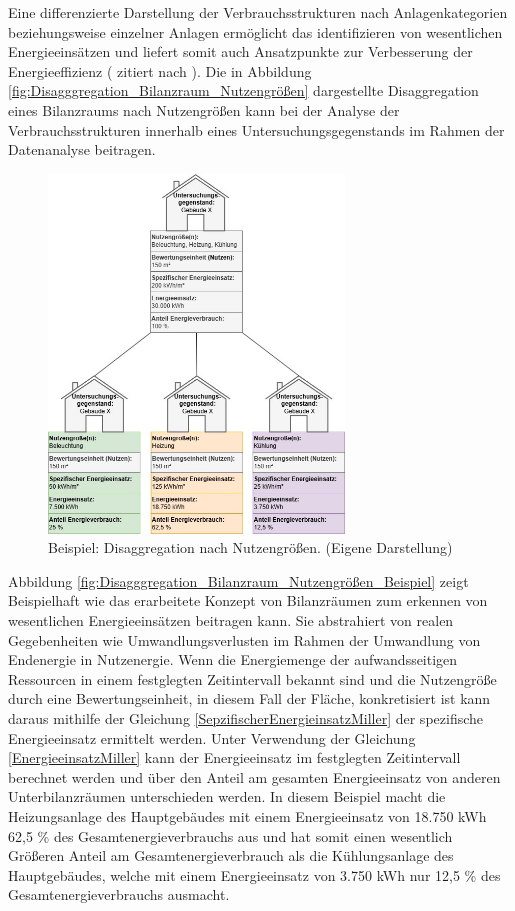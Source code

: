 Eine differenzierte Darstellung der Verbrauchsstrukturen nach Anlagenkategorien beziehungsweise einzelner Anlagen ermöglicht das identifizieren von 
wesentlichen Energieeinsätzen und liefert somit auch Ansatzpunkte zur Verbesserung der Energieeffizienz (\cite{Fink.1997} zitiert nach \cite[S. 8]{Hohnhold.2013}).
Die in Abbildung \eqref{fig:Disagggregation_Bilanzraum_Nutzengrößen} dargestellte Disaggregation eines Bilanzraums nach Nutzengrößen kann bei der Analyse der 
Verbrauchsstrukturen innerhalb eines Untersuchungsgegenstands im Rahmen der Datenanalyse beitragen.

\begin{figure}[H]
    \centering
    \includegraphics[width=0.7\textwidth]{../../Ressourcen/Abbildungen/Nutzengröße_Bewertungseinheit_Zerlegt_Beispiel.jpg}
    \caption{Beispiel: Disaggregation nach Nutzengrößen. (Eigene Darstellung)}
    \label{fig:Disagggregation_Bilanzraum_Nutzengrößen_Beispiel}
\end{figure}

Abbildung \eqref{fig:Disagggregation_Bilanzraum_Nutzengrößen_Beispiel} zeigt Beispielhaft wie das erarbeitete Konzept von Bilanzräumen zum erkennen von 
wesentlichen Energieeinsätzen beitragen kann. 
Sie abstrahiert von realen Gegebenheiten wie Umwandlungsverlusten im Rahmen der Umwandlung von Endenergie in Nutzenergie.
Wenn die Energiemenge der aufwandsseitigen Ressourcen in einem festglegten Zeitintervall bekannt sind und die Nutzengröße durch eine 
Bewertungseinheit, in diesem Fall der Fläche, konkretisiert ist kann daraus mithilfe der Gleichung \eqref{SepzifischerEnergieinsatzMiller} der spezifische 
Energieeinsatz ermittelt werden. 
Unter Verwendung der Gleichung \eqref{EnergieeinsatzMiller} kann der Energieeinsatz im festglegten Zeitintervall berechnet werden und über den Anteil am 
gesamten Energieeinsatz von anderen Unterbilanzräumen unterschieden werden.
In diesem Beispiel macht die Heizungsanlage des Hauptgebäudes mit einem Energieeinsatz von 18.750 kWh 62,5 \% des Gesamtenergieverbrauchs aus und hat somit einen 
wesentlich Größeren Anteil am Gesamtenergieverbrauch als die Kühlungsanlage des Hauptgebäudes, welche mit einem Energieeinsatz von 3.750 kWh nur 12,5 \% des 
Gesamtenergieverbrauchs ausmacht.


